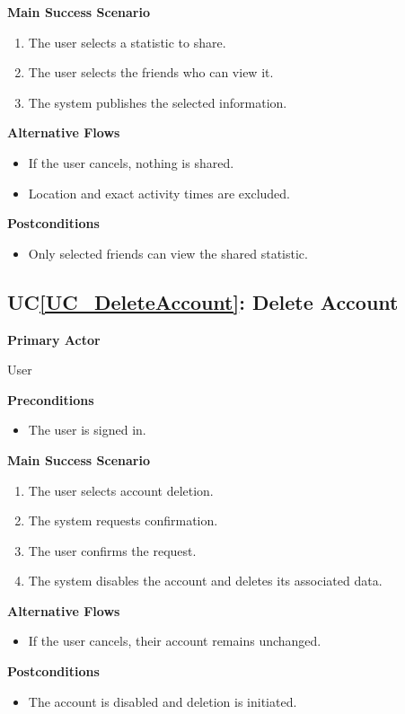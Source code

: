 \documentclass[12pt]{article}
\newcounter{ucnum} %
\newcommand{\ucref}[1]{UC\ref{#1}}
\begin{document}
\textbf{Main Success Scenario}
\begin{enumerate}
\item The user selects a statistic to share.
\item The user selects the friends who can view it.
\item The system publishes the selected information.
\end{enumerate}

\textbf{Alternative Flows}
\begin{itemize}
\item If the user cancels, nothing is shared.
\item Location and exact activity times are excluded.
\end{itemize}

\textbf{Postconditions}
\begin{itemize}
\item Only selected friends can view the shared statistic.
\end{itemize}


\label{UC_DeleteAccount}
\subsection{\ucref{UC_DeleteAccount}: Delete Account}

\textbf{Primary Actor}

User

\textbf{Preconditions}
\begin{itemize}
\item The user is signed in.
\end{itemize}

\textbf{Main Success Scenario}
\begin{enumerate}
\item The user selects account deletion.
\item The system requests confirmation.
\item The user confirms the request.
\item The system disables the account and deletes its associated data.
\end{enumerate}

\textbf{Alternative Flows}
\begin{itemize}
\item If the user cancels, their account remains unchanged.
\end{itemize}

\textbf{Postconditions}
\begin{itemize}
\item The account is disabled and deletion is initiated.
\end{itemize}
\end{document}
